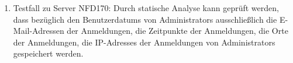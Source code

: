 \begin{enumerate}[label=\textbf{/T\arabic*0/}, align=left]
	\item Testfall zu Server NFD170: Durch \gls{statische Analyse} kann geprüft werden, dass bezüglich den \Glspl{Benutzerdatum} von \Glspl{Administrator} ausschließlich die E-Mail-Adressen der Anmeldungen, die Zeitpunkte der Anmeldungen, die Orte der Anmeldungen, die \Glspl{IP-Adresse} der Anmeldungen von \Glspl{Administrator} gespeichert werden.
\end{enumerate}